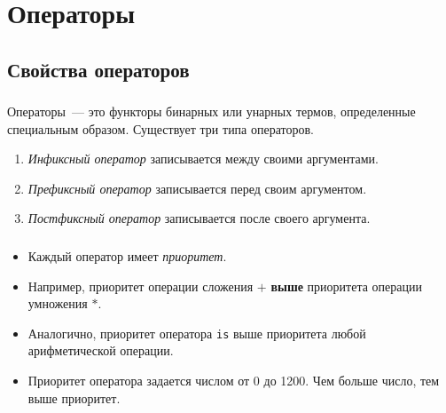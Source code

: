 \section{Операторы}
\subsection{Свойства операторов}

\begin{frame}

	\begin{center}
		\Huge \insertsection
	\end{center}

\end{frame}


\begin{frame}

	\frametitle{\insertsection}
	\framesubtitle{\insertsubsection}

	\alert{Операторы}~--- это функторы бинарных или унарных термов, определенные специальным образом. Существует три типа операторов.
	
	\begin{enumerate}
		\item \textit{Инфиксный оператор} записывается между своими аргументами.
		\item \textit{Префиксный оператор} записывается перед своим аргументом.
		\item \textit{Постфиксный оператор} записывается после своего аргумента.
	\end{enumerate}

\end{frame}


\begin{frame}

	\frametitle{\insertsection}
	\framesubtitle{\insertsubsection}
	
	\begin{itemize}
		\item Каждый оператор имеет \textit{приоритет}.
		\item Например, приоритет операции сложения \(+\) \textbf{выше} приоритета операции умножения \(*\).
		\item Аналогично, приоритет оператора \texttt{is} выше приоритета любой арифметической операции.
		\item Приоритет оператора задается числом от 0 до 1200. Чем больше число, тем выше приоритет.
	\end{itemize}

\end{frame}


